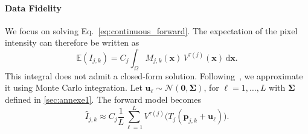 \documentclass[preprint,authoryear,12pt]{elsarticle}
\begin{document}
\paragraph{Data Fidelity}

We focus on solving Eq.~\eqref{eq:continuous_forward}. The expectation of the pixel intensity can therefore be written as
\begin{equation} \mathbb{E}(I_{j,k}) = C_j \int_{\Omega} M_{j,k}(\mathbf{x}) \, V^{\tau(j)}(\mathbf{x}) \, \mathrm{d}\mathbf{x}. \end{equation}
This integral does not admit a closed-form solution. Following~\citet{xu_nesvor_2023}, we approximate it using Monte Carlo integration. 
Let $\mathbf{u}_\ell \sim \mathcal{N}(\mathbf{0},\boldsymbol{\Sigma})$, for $\ell=1,\dots,L$ with $\boldsymbol{\Sigma}$ defined in \ref{sec:annexe1}. The forward model becomes
\begin{equation}
\hat{I}_{j,k}
\approx
C_j
\frac{1}{L}
\sum_{\ell=1}^{L}
V^{\tau(j)}\!\big(
T_j(\mathbf{p}_{j,k}+\mathbf{u}_\ell)
\big).
\label{eq:expectedI}
\end{equation}
\end{document}
